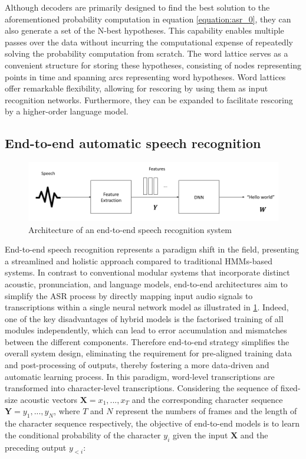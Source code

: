 Although decoders are primarily designed to find the best solution to the aforementioned probability computation in equation \ref{equation:asr_0}, they can also generate a set of the N-best hypotheses. This capability enables multiple passes over the data without incurring the computational expense of repeatedly solving the probability computation from scratch. The word lattice \cite{richardson1995lattice} serves as a convenient structure for storing these hypotheses, consisting of nodes representing points in time and spanning arcs representing word hypotheses.
Word lattices offer remarkable flexibility, allowing for rescoring by using them as input recognition networks. Furthermore, they can be expanded to facilitate rescoring by a higher-order language model.


\newpage
\subsection{End-to-end automatic speech recognition} %
\label{section:SOTAE2E}
\begin{figure}
    \centering
    \includegraphics[width=\textwidth]{imgs/End2End_architeccture.png}
    \caption{Architecture of an end-to-end speech recognition system}
    \label{fig:e2e_archi}
\end{figure}
End-to-end speech recognition represents a paradigm shift in the field, presenting a streamlined and holistic approach compared to traditional \acp{HMM}-based systems. In contrast to conventional modular systems that incorporate distinct acoustic, pronunciation, and language models, end-to-end architectures aim to simplify the \ac{ASR} process by directly mapping input audio signals to transcriptions within a single neural network model as illustrated in \ref{fig:e2e_archi}. Indeed, one of the key disadvantages of hybrid models is the factorised training of all modules independently, which can lead to error accumulation and mismatches between the different components. Therefore end-to-end strategy simplifies the overall system design, eliminating the requirement for pre-aligned training data and post-processing of outputs, thereby fostering a more data-driven and automatic learning process.
In this paradigm, word-level transcriptions are transformed into character-level transcriptions. Considering the sequence of fixed-size acoustic vectors $\boldsymbol{X}=x_1,...,x_T$ and the corresponding character sequence $\boldsymbol{Y}=y_1,...,y_N$, where $T$ and $N$ represent the numbers of frames and the length of the character sequence respectively, the objective of end-to-end models is to learn the conditional probability of the character $y_i$ given the input $\boldsymbol{X}$ and the preceding output $y_{<i}$:

